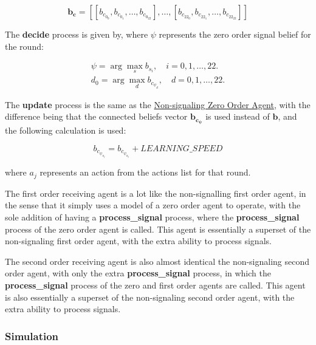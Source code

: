 \[
\mathbf{b_c} = [[b_{c_{0_{0}}}, b_{c_{0_{1}}}, \ldots, b_{c_{0_{22}}}], \ldots, [b_{c_{22_{0}}}, b_{c_{22_{1}}}, \ldots, b_{c_{22_{22}}}]]
\]

The \textbf{decide} process is given by, where $\psi$ represents the zero order signal belief for the round:

\begin{equation*}
\begin{aligned}
    \psi = \arg\max_s b_{s_i}, \quad i = 0, 1, \ldots, 22. \\
    d_0 = \arg\max_d b_{c_{{\psi}_d}}, \quad d = 0, 1, \ldots, 22.
\end{aligned}
\end{equation*}

The \textbf{update} process is the same as the \hyperref[eq:zero-order-update]{Non-signaling Zero Order Agent}, with the difference being that the connected beliefs vector $\mathbf{b_{c_\psi}}$ is used instead of $\mathbf{b}$, and the following calculation is used:

\begin{equation*}
    b_{c_{\psi_{a_j}}} = b_{c_{\psi_{a_j}}} + LEARNING\_SPEED
\end{equation*}

where $a_j$ represents an action from the actions list for that round.


The first order receiving agent is a lot like the non-signalling first order agent, in the sense that it simply uses a model of a zero order agent to operate, with the sole addition of having a \textbf{process\_signal} process, where the \textbf{process\_signal} process of the zero order agent is called. This agent is essentially a superset of the non-signaling first order agent, with the extra ability to process signals.


The second order receiving agent is also almost identical the non-signaling second order agent, with only the extra \textbf{process\_signal} process, in which the \textbf{process\_signal} process of the zero and first order agents are called. This agent is also essentially a superset of the non-signaling second order agent, with the extra ability to process signals.

\subsubsection{Simulation}

